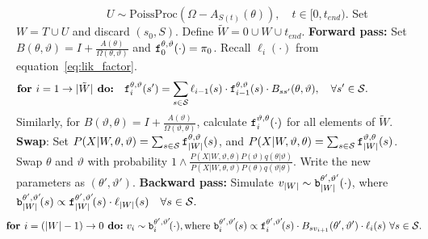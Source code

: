 \begin{algorithm}[H]
\begin{algorithmic}[1]
    \vspace{-.05in}
    $\qquad \qquad \qquad \qquad U \sim \text{PoissProc}(\Omega - A_{S(t)}(\theta)), \quad t \in [0,t_{end})$.
    \State Set $W = T \cup U$ and discard $(s_0,S)$. Define $\tilde{W} = 0 \cup W \cup t_{end}$.
    \State \textbf{Forward pass:} Set $B(\theta,\vartheta) = I + \frac{A(\theta)}{\Omega(\theta, \vartheta)}$ and $\mathtt{f}^{\theta, \vartheta}_0(\cdot) = \pi_0$. Recall $\ell_i(\cdot)$ from equation~\eqref{eq:lik_factor}.
    \vspace{-.25in}
        $$\textbf{for } i=1\rightarrow |\tilde{W}|\textbf{ do:} \quad \fwd^{\theta,\vartheta}_i(s') = \sum_{s \in \cS} \ell_{i-1}(s) \cdot \fwd^{\theta,\vartheta}_{i-1}(s)\cdot B_{ss'}(\theta,\vartheta), \quad \forall s' \in \cS.\qquad\qquad\quad
    \vspace{-.1in}
        $$
        Similarly, for $B(\vartheta,\theta) = I + \frac{A(\vartheta)}{\Omega(\vartheta, \theta)}$, calculate $\mathtt{f}^{\vartheta,\theta}_i(\cdot)$ for all elements of $\tilde{W}$.
    \State \textbf{Swap}: 
        Set $P(X|W,\theta,\vartheta) = \sum_{s \in {\mathcal S}} \mathtt{f}^{\theta,\vartheta}_{|W|}(s)$, and $P(X|W,\vartheta,\theta) = \sum_{s \in {\mathcal S}} \mathtt{f}^{\vartheta,\theta}_{|W|}(s)$.
        Swap $\theta$ and $\vartheta$ with probability 
     $
     1 \wedge \frac{P(X| W,\vartheta,\theta)P(\vartheta)q(\theta|\vartheta)}
        {P(X| W,\theta, \vartheta)P(\theta) q(\vartheta|\theta)}.
        $
    Write the new parameters as $(\theta',\vartheta')$.
    \State \textbf{Backward pass:}
    Simulate $v_{|W|} \sim \mathtt{b}^{\theta',\vartheta'}_{|W|}(\cdot)$, where $\mathtt{b}^{\theta',\vartheta'}_{|W|}\!(s) \propto \mathtt{f}^{\theta',\vartheta'}_{|W|}\!(s)\cdot\ell_{|W|}(s) \quad \forall s \in {\mathcal S}.$ 
    \vspace{-.1in}
    $$\hspace{-.15in} \textbf{for } i=(|W|-1)\rightarrow 0\textbf{ do:} \ v_i \sim \bck^{\theta',\vartheta'}_i\!(\cdot), \text{where } 
    \bck^{\theta',\vartheta'}_i\!(s) \propto \fwd^{\theta',\vartheta'}_i\!(s)\cdot B_{sv_{i+1}}(\theta',\vartheta') \cdot \ell_i(s)  \ \forall s \in \cS.$$
    

\end{algorithmic}
\end{algorithm}
